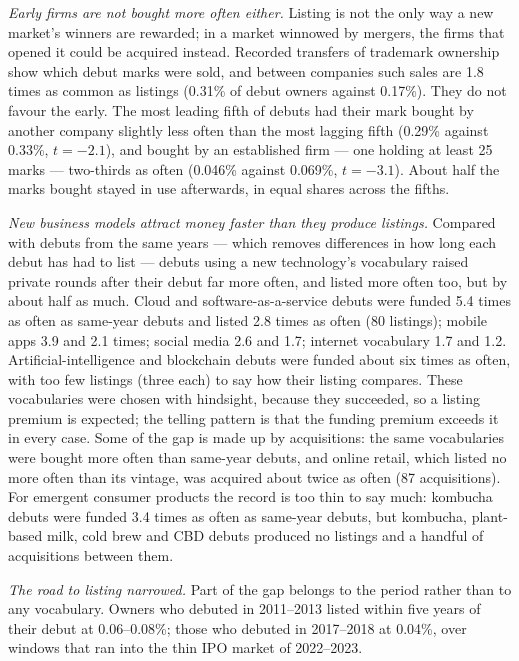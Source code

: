 \emph{Early firms are not bought more often either.} Listing is not the
only way a new market's winners are rewarded; in a market winnowed by
mergers, the firms that opened it could be acquired instead. Recorded
transfers of trademark ownership show which debut marks were sold, and
between companies such sales are 1.8 times as common as listings
(0.31\% of debut owners against 0.17\%). They do not favour the early.
The most leading fifth of debuts had their mark bought by another
company slightly less often than the most lagging fifth (0.29\% against
0.33\%, $t = -2.1$), and bought by an established firm --- one holding
at least 25 marks --- two-thirds as often (0.046\% against 0.069\%,
$t = -3.1$). About half the marks bought stayed in use afterwards, in
equal shares across the fifths.

\emph{New business models attract money faster than they produce
listings.} Compared with debuts from the same years --- which removes
differences in how long each debut has had to list --- debuts using a
new technology's vocabulary raised private rounds after their debut far
more often, and listed more often too, but by about half as much. Cloud
and software-as-a-service debuts were funded 5.4 times as often as
same-year debuts and listed 2.8 times as often (80 listings); mobile
apps 3.9 and 2.1 times; social media 2.6 and 1.7; internet vocabulary
1.7 and 1.2. Artificial-intelligence and blockchain debuts were funded
about six times as often, with too few listings (three each) to say how
their listing compares. These vocabularies were chosen with hindsight,
because they succeeded, so a listing premium is expected; the telling
pattern is that the funding premium exceeds it in every case. Some of
the gap is made up by acquisitions: the same vocabularies were bought
more often than same-year debuts, and online retail, which listed no
more often than its vintage, was acquired about twice as often (87
acquisitions). For emergent consumer products the record is too thin
to say much: kombucha debuts were funded 3.4 times as often as same-year
debuts, but kombucha, plant-based milk, cold brew and CBD debuts
produced no listings and a handful of acquisitions between them.

\emph{The road to listing narrowed.} Part of the gap belongs to the
period rather than to any vocabulary. Owners who debuted in 2011--2013
listed within five years of their debut at 0.06--0.08\%; those who
debuted in 2017--2018 at 0.04\%, over windows that ran into the thin
IPO market of 2022--2023.


